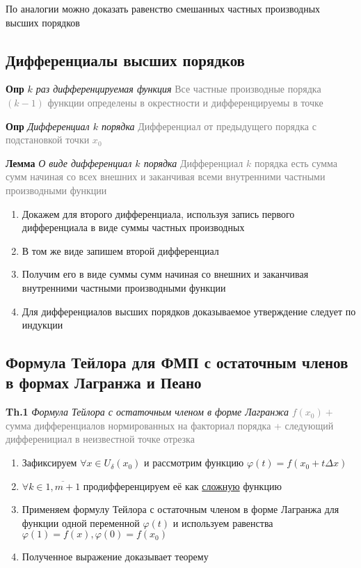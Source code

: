 По аналогии можно доказать равенство смешанных частных производных высших порядков

\subsection{Дифференциалы высших порядков}

\textbf{Опр} \textit{$k$ раз дифференцируемая функция}
\textcolor{gray}{Все частные производные порядка $(k - 1)$ функции определены в окрестности и дифференцируемы в точке}

\textbf{Опр} \textit{Дифференциал $k$ порядка}
\textcolor{gray}{Дифференциал от предыдущего порядка с подстановкой точки $x_0$}

\textbf{Лемма} \textit{О виде дифференциал $k$ порядка}
\textcolor{gray}{Дифференциал $k$ порядка есть сумма сумм начиная со всех внешних и заканчивая всеми внутренними
частными производными функции}

\begin{enumerate}
    \item Докажем для второго дифференциала, используя запись первого дифференциала в виде суммы частных производных
    \item В том же виде запишем второй дифференциал
    \item Получим его в виде суммы сумм начиная со внешних и заканчивая внутренними частными производными функции
    \item Для дифференциалов высших порядков доказываемое утверждение следует по индукции
\end{enumerate}

\subsection{Формула Тейлора для ФМП с остаточным членов в формах Лагранжа и Пеано}

\textbf{Th.1} \textit{Формула Тейлора с остаточным членом в форме Лагранжа}
\textcolor{gray}{$f(x_0) +$ сумма дифференциалов нормированных на факториал порядка +
следующий дифференициал в неизвестной точке отрезка}

\begin{enumerate}
    \item Зафиксируем $\forall x \in U_{\delta}(x_0)$ и рассмотрим функцию $\varphi(t) = f(x_0 + t\Delta x)$
    \item $\forall k \in \overline{1, m+1}$ продифференцируем её как \underline{сложную} функцию
    \item Применяем формулу Тейлора с остаточным членом в форме Лагранжа для функции одной переменной $\varphi(t)$
    и используем равенства $\varphi (1) = f(x), \varphi (0) = f(x_0)$
    \item Полученное выражение доказывает теорему
\end{enumerate}


